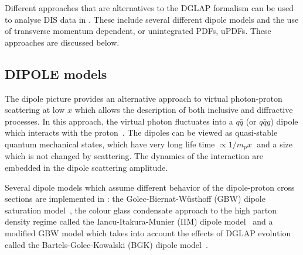

Different approaches that are alternatives to the DGLAP formalism can be used to analyse DIS data in \fitter.
These include several different dipole models and the use of 
transverse momentum dependent, or unintegrated PDFs, uPDFs.
These approaches are discussed below.

\subsection{DIPOLE models}

The dipole picture provides an alternative approach to virtual photon-proton
 scattering at low $x$ which allows the description of both inclusive and 
diffractive processes.
 In this approach, the virtual photon fluctuates into a $q\bar q$ (or $q\bar q g$) 
 dipole which interacts with the proton~\cite{NNZ:91}.  
The dipoles can be viewed as quasi-stable quantum mechanical states, which have very long 
life time $\propto 1/m_p x\;$ and a size which is not changed by scattering.
The dynamics of the interaction are embedded in the dipole scattering amplitude.


Several dipole models which assume different behavior of the dipole-proton 
cross sections are implemented in \fitter:
the Golec-Biernat-W\"usthoff (GBW)
dipole saturation model~\cite{Golec-Biernat:1998js},
the colour glass condensate approach to the high parton density 
regime called the Iancu-Itakura-Munier (IIM) dipole model~\cite{Iancu:2003ge} and 
a modified GBW model which takes into account the effects of  
DGLAP evolution called the Bartels-Golec-Kowalski (BGK) dipole model~\cite{Bartels:2002cj}.

